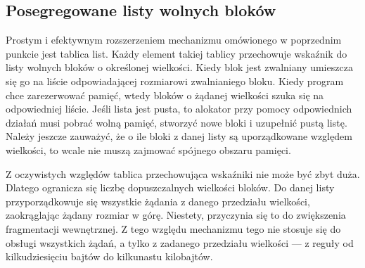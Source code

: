 \documentclass[12pt,a4paper,titlepage,twoside]{mwart}
\begin{document}
\subsection{Posegregowane listy wolnych bloków}

Prostym i efektywnym rozszerzeniem mechanizmu omówionego w poprzednim punkcie
jest tablica list. Każdy element takiej tablicy przechowuje wskaźnik do listy
wolnych bloków o określonej wielkości. Kiedy blok jest zwalniany umieszcza się
go na liście odpowiadającej rozmiarowi zwalnianiego bloku. Kiedy program chce
zarezerwować pamięć, wtedy bloków o żądanej wielkości szuka się na odpowiedniej
liście. Jeśli lista jest pusta, to alokator przy pomocy odpowiednich działań
musi pobrać wolną pamięć, stworzyć nowe bloki i uzupełnić pustą listę.  Należy
jeszcze zauważyć, że o ile bloki z danej listy są uporządkowane względem
wielkości, to wcale nie muszą zajmować spójnego obszaru pamięci.

Z oczywistych względów tablica przechowująca wskaźniki nie może być zbyt duża.
Dlatego ogranicza się liczbę dopuszczalnych wielkości bloków. Do danej listy
przyporządkowuje się wszystkie żądania z danego przedziału wielkości,
zaokrąglając żądany rozmiar w górę. Niestety, przyczynia się to do zwiększenia
fragmentacji wewnętrznej. Z tego względu mechanizmu tego nie stosuje się do
obsługi wszystkich żądań, a tylko z zadanego przedziału wielkości --- z reguły
od kilkudziesięciu bajtów do kilkunastu kilobajtów.
\end{document}
